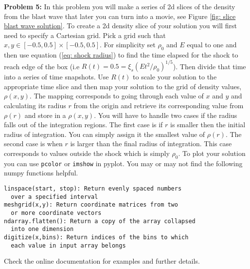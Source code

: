 \documentclass{article}
\begin{document}
\bigskip
\noindent
\textbf{Problem 5:} In this problem you will make a series of 2d slices of the density from the blast wave that later you can turn into a movie, see Figure \ref{fig: slice blast wave solution}. To create a 2d density slice of your solution you will first need to specify a Cartesian grid. Pick a grid such that $x,y\in [-0.5,0.5]\times[-0.5,0.5]$. For simplicity set $\rho_0$ and $E$ equal to one and then use equation (\ref{eq: shock radius}) to find the time elapsed for the shock to reach edge of the box (i.e $R(t)=0.5=\xi_s (Et^2/\rho_0)^{1/5}$). Then divide that time into a series of time snapshots. Use $R(t)$ to scale your solution to the appropriate time slice and then map your solution to the grid of density values, $\rho(x,y)$. The mapping corresponds to going through each value of $x$ and $y$ and calculating its radius $r$ from the origin and retrieve its corresponding value from $\rho(r)$ and store in a $\rho(x,y)$. You will have to handle two cases if the radius falls out of the integration regions. The first case is if $r$ is smaller then the initial radius of integration. You can simply assign it the smallest value of $\rho(r)$. The second case is when $r$ is larger than the final radius of integration. This case corresponds to values outside the shock which is simply $\rho_0$. To plot your solution you can use {\tt pcolor} or {\tt imshow} in pyplot. You may or may not find the following numpy functions helpful. 
\begin{verbatim}
linspace(start, stop): Return evenly spaced numbers
  over a specified interval
meshgrid(x,y): Return coordinate matrices from two
  or more coordinate vectors
ndarray.flatten(): Return a copy of the array collapsed
  into one dimension
digitize(x,bins): Return indices of the bins to which
  each value in input array belongs
\end{verbatim}
Check the online documentation for examples and further details.
\end{document}

